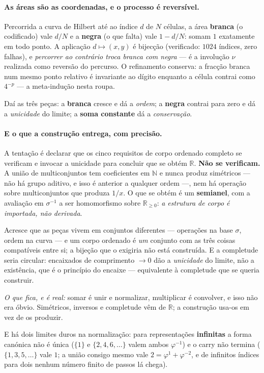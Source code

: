 \documentclass[11pt]{article}
\providecommand{\N}{\mathbb N}
\newcommand{\R}{\mathbb R}
\theoremstyle{plain}
\theoremstyle{remark}
\begin{document}
\begin{itemize}
\paragraph{As áreas são as coordenadas, e o processo é reversível.} Percorrida a curva de Hilbert
até ao índice $d$ de $N$ células, a área \textbf{branca} (o codificado) vale $d/N$ e a
\textbf{negra} (o que falta) vale $1-d/N$: somam $1$ exatamente em todo ponto. A aplicação
$d\mapsto(x,y)$ é bijecção (verificado: $1024$ índices, zero falhas), e \emph{percorrer ao
contrário troca branca com negra} --- é a involução $\nu$ realizada como reversão do percurso. O
refinamento conserva: a fracção branca num mesmo ponto relativo é invariante ao dígito enquanto a
célula contrai como $4^{-p}$ --- a meta-indução nesta roupa.

Daí as três peças: a \textbf{branca} cresce e dá a \emph{ordem}; a \textbf{negra} contrai para
zero e dá a \emph{unicidade} do limite; a \textbf{soma constante} dá a \emph{conservação}.

\paragraph{E o que a construção entrega, com precisão.} A tentação é declarar que os cinco
requisitos de corpo ordenado completo se verificam e invocar a unicidade para concluir que se
obtém $\R$. \textbf{Não se verificam.} A união de multiconjuntos tem coeficientes em $\N$ e nunca
produz simétricos --- não há grupo aditivo, e isso é anterior a qualquer ordem ---, nem há operação
sobre multiconjuntos que produza $1/x$. O que se obtém é um \textbf{semianel}, com a avaliação em
$\sigma^{-1}$ a ser homomorfismo sobre $\R_{\geq0}$: \emph{a estrutura de corpo é importada, não
derivada}.

Acresce que as peças vivem em conjuntos diferentes --- operações na base $\sigma$, ordem na curva
--- e um corpo ordenado é \emph{um} conjunto com as três coisas compatíveis entre si; a bijeção que
o exigiria não está construída. E a completude seria circular: encaixados de comprimento $\to0$ dão
a \emph{unicidade} do limite, não a existência, que é o princípio do encaixe --- equivalente à
completude que se queria construir.

\emph{O que fica, e é real:} somar é unir e normalizar, multiplicar é convolver, e isso não era
óbvio. Simétricos, inversos e completude vêm de $\R$; a construção usa-os em vez de os produzir.

E há dois limites duros na normalização: para representações \textbf{infinitas} a forma canónica
não é única ($\{1\}$ e $\{2,4,6,\dots\}$ valem ambos $\varphi^{-1}$) e o carry não termina
($\{1,3,5,\dots\}$ vale $1$; a união consigo mesmo vale $2 = \varphi^1+\varphi^{-2}$, e de
infinitos índices para dois nenhum número finito de passos lá chega).



\end{itemize}
\end{document}
